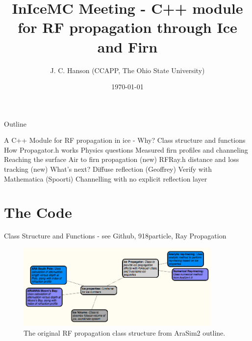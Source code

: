 \documentclass{beamer}
\title{InIceMC Meeting - C++ module for RF propagation through Ice and Firn}
\date{\today}
\author{J. C. Hanson (CCAPP, The Ohio State University)}
\institute{CCAPP @ OSU}
\begin{document}
 \maketitle
\small

\begin{frame}{Outline}
\begin{outline}[enumerate]
\1 A C++ Module for RF propagation in ice - Why?
\2 Class structure and functions
\2 How Propagator.h works
\1 Physics questions
\2 Measured firn profiles and channeling
\2 Reaching the surface
\2 Air to firn propagation (new)
\2 RFRay.h distance and loss tracking (new)
\1 What's next?
\2 Diffuse reflection (Geoffrey)
\2 Verify with Mathematica (Spoorti)
\2 Channelling with no explicit reflection layer
\end{outline}
\end{frame}

\section{The Code}

\begin{frame}{Class Structure and Functions - see Github, 918particle, Ray Propagation}
\begin{figure}
\begin{center}
\includegraphics[width=0.9\textwidth]{figures/Propagation.png}
\caption{\label{fig:fig1} The original RF propagation class structure from AraSim2 outline.}
\end{center}
\end{figure}
\end{frame}
\end{document}
